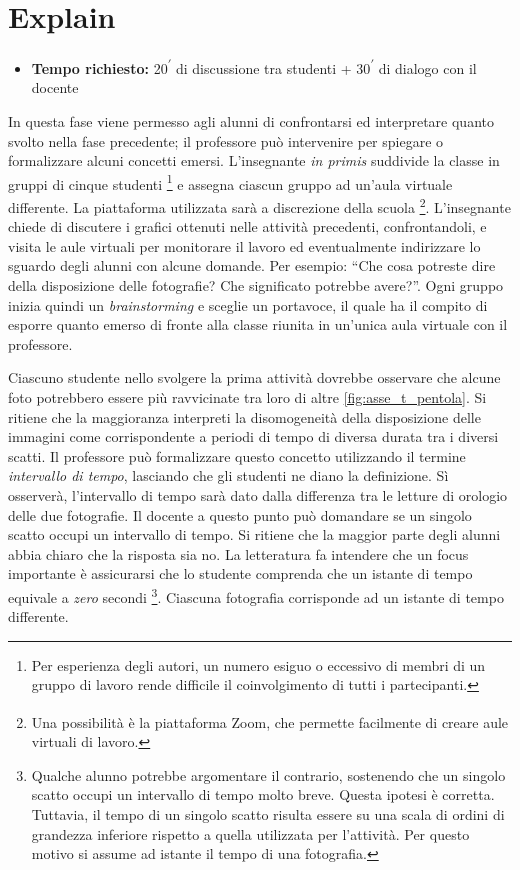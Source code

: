 \documentclass{report} \usepackage[T1]{fontenc} \usepackage[italian]{babel}
\begin{document}
\section{Explain}\label{posizioni_istanti_explain}
\begin{itemize}
\item \textbf{Tempo richiesto:} 20\textsuperscript{$\prime$} di discussione tra
studenti + 30\textsuperscript{$\prime$} di dialogo con il docente
\end{itemize}

In questa fase viene permesso agli alunni di confrontarsi ed interpretare
quanto svolto nella fase precedente; il professore può intervenire per spiegare
o formalizzare alcuni concetti emersi.
L’insegnante \emph{in primis} suddivide la classe in gruppi di cinque studenti
\footnote{
          Per  esperienza degli autori, un numero esiguo o eccessivo di membri
          di un gruppo di lavoro rende difficile il coinvolgimento di tutti i
          partecipanti.
         }
e assegna
ciascun gruppo ad un’aula virtuale differente. La piattaforma utilizzata sarà a
discrezione della scuola
\footnote{
          Una possibilità è la piattaforma Zoom\textsuperscript{\textregistered},
          che  permette facilmente di creare aule virtuali di lavoro.
         }.
L’insegnante chiede di
discutere i grafici ottenuti nelle attività precedenti, confrontandoli, e
visita le aule virtuali per monitorare il lavoro ed eventualmente indirizzare
lo sguardo degli alunni con alcune domande. Per esempio: ``Che cosa potreste
dire della disposizione delle fotografie? Che significato potrebbe avere?''.
Ogni gruppo inizia quindi un \emph{brainstorming} e sceglie un portavoce,
il quale ha il  compito di esporre quanto emerso di fronte alla classe riunita
in un’unica aula virtuale con il professore.

Ciascuno studente nello svolgere la prima attività dovrebbe osservare che
alcune foto potrebbero essere più ravvicinate tra loro di altre
\ref{fig:asse_t_pentola}. Si ritiene che la maggioranza
interpreti la disomogeneità della disposizione delle
immagini come corrispondente a periodi di tempo di diversa durata tra i diversi
scatti. Il professore può formalizzare questo concetto utilizzando il termine
\emph{intervallo di tempo}, lasciando che gli studenti ne diano la definizione.
Sì osserverà, l’intervallo di tempo sarà dato dalla differenza tra le
letture di orologio delle due fotografie. Il docente a questo punto può
domandare se un singolo scatto occupi un intervallo di tempo. Si ritiene che la
maggior parte degli alunni abbia chiaro che la risposta sia no. La letteratura
fa intendere che un focus importante è assicurarsi che lo studente comprenda
che un istante di tempo equivale a \emph{zero} secondi\cite{arons1997teaching}
\footnote{
          Qualche alunno potrebbe argomentare il contrario, sostenendo che un singolo scatto
          occupi un intervallo di tempo molto breve. Questa ipotesi è corretta. Tuttavia,
          il tempo di un singolo scatto risulta essere su una scala di ordini di
          grandezza inferiore rispetto a quella utilizzata per l’attività. Per questo
          motivo si assume ad istante il tempo di una fotografia.
         }.
Ciascuna fotografia corrisponde ad un istante di tempo differente.
\end{document}
